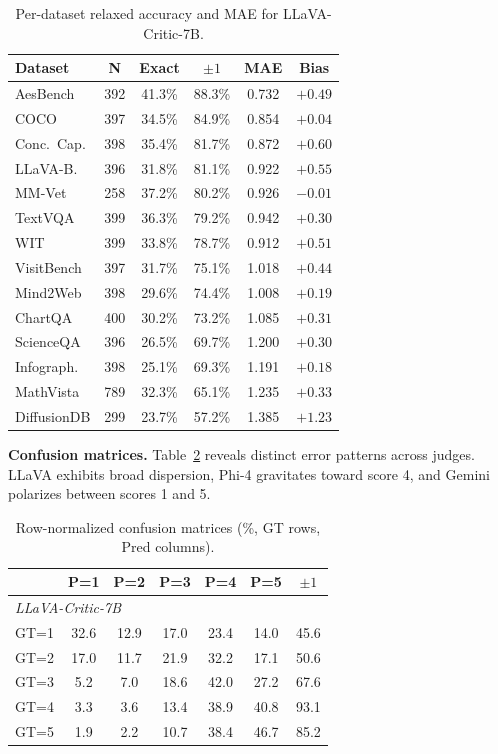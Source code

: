 \documentclass{article}
\begin{document}
\begin{table}[t]
\centering
\caption{Per-dataset relaxed accuracy and MAE for LLaVA-Critic-7B.}
\label{tab:relaxed_accuracy}
\small
\begin{tabular}{lccccc}
\toprule
\textbf{Dataset} & \textbf{N} & \textbf{Exact} & $\pm 1$ & \textbf{MAE} & \textbf{Bias} \\
\midrule
AesBench & 392 & 41.3\% & 88.3\% & 0.732 & $+0.49$ \\
COCO & 397 & 34.5\% & 84.9\% & 0.854 & $+0.04$ \\
Conc.\ Cap. & 398 & 35.4\% & 81.7\% & 0.872 & $+0.60$ \\
LLaVA-B. & 396 & 31.8\% & 81.1\% & 0.922 & $+0.55$ \\
MM-Vet & 258 & 37.2\% & 80.2\% & 0.926 & $-0.01$ \\
TextVQA & 399 & 36.3\% & 79.2\% & 0.942 & $+0.30$ \\
WIT & 399 & 33.8\% & 78.7\% & 0.912 & $+0.51$ \\
VisitBench & 397 & 31.7\% & 75.1\% & 1.018 & $+0.44$ \\
Mind2Web & 398 & 29.6\% & 74.4\% & 1.008 & $+0.19$ \\
ChartQA & 400 & 30.2\% & 73.2\% & 1.085 & $+0.31$ \\
ScienceQA & 396 & 26.5\% & 69.7\% & 1.200 & $+0.30$ \\
Infograph. & 398 & 25.1\% & 69.3\% & 1.191 & $+0.18$ \\
MathVista & 789 & 32.3\% & 65.1\% & 1.235 & $+0.33$ \\
DiffusionDB & 299 & 23.7\% & 57.2\% & 1.385 & $+1.23$ \\
\bottomrule
\end{tabular}
\end{table}

\textbf{Confusion matrices.}
Table~\ref{tab:confusion} reveals distinct error patterns across judges. LLaVA exhibits broad dispersion, Phi-4 gravitates toward score 4, and Gemini polarizes between scores 1 and 5.

\begin{table}[t]
\centering
\caption{Row-normalized confusion matrices (\%, GT rows, Pred columns).}
\label{tab:confusion}
\small
\begin{tabular}{l|ccccc|c}
\toprule
& \textbf{P=1} & \textbf{P=2} & \textbf{P=3} & \textbf{P=4} & \textbf{P=5} & $\pm 1$ \\
\midrule
\multicolumn{7}{l}{\emph{LLaVA-Critic-7B}} \\
GT=1 & 32.6 & 12.9 & 17.0 & 23.4 & 14.0 & 45.6 \\
GT=2 & 17.0 & 11.7 & 21.9 & 32.2 & 17.1 & 50.6 \\
GT=3 & 5.2 & 7.0 & 18.6 & 42.0 & 27.2 & 67.6 \\
GT=4 & 3.3 & 3.6 & 13.4 & 38.9 & 40.8 & 93.1 \\
GT=5 & 1.9 & 2.2 & 10.7 & 38.4 & 46.7 & 85.2 \\
\bottomrule
\end{tabular}
\end{table}
\end{document}
